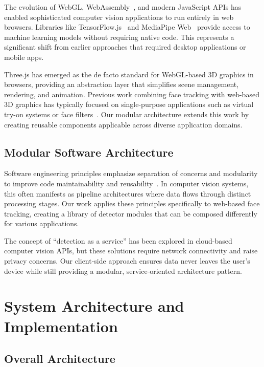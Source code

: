 \documentclass[sigconf]{acmart}
\begin{document}
The evolution of WebGL, WebAssembly~\cite{haas2017bringing}, and modern JavaScript APIs has enabled sophisticated computer vision applications to run entirely in web browsers. Libraries like TensorFlow.js~\cite{smilkov2019tensorflow} and MediaPipe Web~\cite{kartynnik2019real} provide access to machine learning models without requiring native code. This represents a significant shift from earlier approaches that required desktop applications or mobile apps.

Three.js has emerged as the de facto standard for WebGL-based 3D graphics in browsers, providing an abstraction layer that simplifies scene management, rendering, and animation. Previous work combining face tracking with web-based 3D graphics has typically focused on single-purpose applications such as virtual try-on systems or face filters~\cite{cao2016real}. Our modular architecture extends this work by creating reusable components applicable across diverse application domains.

\subsection{Modular Software Architecture}

Software engineering principles emphasize separation of concerns and modularity to improve code maintainability and reusability~\cite{parnas1972criteria}. In computer vision systems, this often manifests as pipeline architectures where data flows through distinct processing stages. Our work applies these principles specifically to web-based face tracking, creating a library of detector modules that can be composed differently for various applications.

The concept of ``detection as a service'' has been explored in cloud-based computer vision APIs, but these solutions require network connectivity and raise privacy concerns. Our client-side approach ensures data never leaves the user's device while still providing a modular, service-oriented architecture pattern.

\section{System Architecture and Implementation}
\label{sec:architecture}

\subsection{Overall Architecture}
\end{document}
